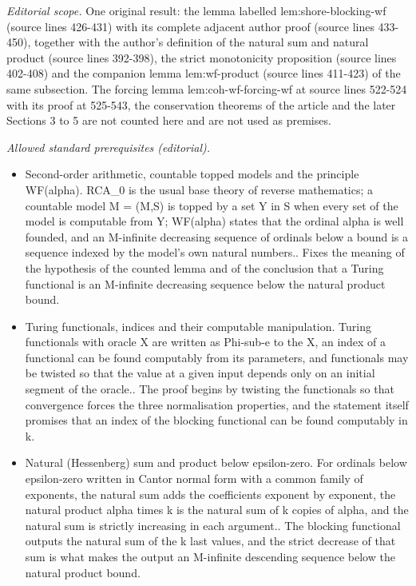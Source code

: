 \documentclass{article}
\numberwithin{theorem}{section}
\begin{document}
\noindent\textit{Editorial scope.} One original result: the lemma labelled lem:shore-blocking-wf (source lines 426-431) with its complete adjacent author proof (source lines 433-450), together with the author's definition of the natural sum and natural product (source lines 392-398), the strict monotonicity proposition (source lines 402-408) and the companion lemma lem:wf-product (source lines 411-423) of the same subsection. The forcing lemma lem:coh-wf-forcing-wf at source lines 522-524 with its proof at 525-543, the conservation theorems of the article and the later Sections 3 to 5 are not counted here and are not used as premises.\par\medskip
\noindent\textit{Allowed standard prerequisites (editorial).}\begin{itemize}
\item Second-order arithmetic, countable topped models and the principle WF(alpha). RCA\_0 is the usual base theory of reverse mathematics; a countable model M = (M,S) is topped by a set Y in S when every set of the model is computable from Y; WF(alpha) states that the ordinal alpha is well founded, and an M-infinite decreasing sequence of ordinals below a bound is a sequence indexed by the model's own natural numbers.. Fixes the meaning of the hypothesis of the counted lemma and of the conclusion that a Turing functional is an M-infinite decreasing sequence below the natural product bound.
\item Turing functionals, indices and their computable manipulation. Turing functionals with oracle X are written as Phi-sub-e to the X, an index of a functional can be found computably from its parameters, and functionals may be twisted so that the value at a given input depends only on an initial segment of the oracle.. The proof begins by twisting the functionals so that convergence forces the three normalisation properties, and the statement itself promises that an index of the blocking functional can be found computably in k.
\item Natural (Hessenberg) sum and product below epsilon-zero. For ordinals below epsilon-zero written in Cantor normal form with a common family of exponents, the natural sum adds the coefficients exponent by exponent, the natural product alpha times k is the natural sum of k copies of alpha, and the natural sum is strictly increasing in each argument.. The blocking functional outputs the natural sum of the k last values, and the strict decrease of that sum is what makes the output an M-infinite descending sequence below the natural product bound.
\end{itemize}\medskip
\end{document}
